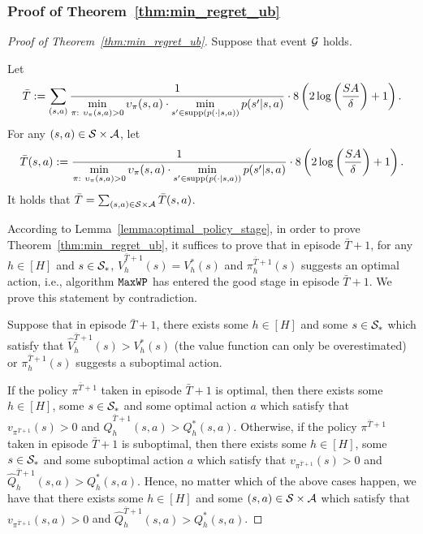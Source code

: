\subsubsection{Proof of Theorem~\ref{thm:min_regret_ub}}


\begin{proof}[Proof of Theorem~\ref{thm:min_regret_ub}]
	Suppose that event $\mathcal{G}$ holds.
	
	Let 
	$$
	\bar{T}:= \sum \limits_{(s,a)} \frac{1}{\min \limits_{\begin{subarray}{c} \pi:\  \upsilon_{\pi}(s,a)>0 \end{subarray}} \upsilon_{\pi}(s,a) \cdot \min \limits_{s' \in \textup{supp}( p(\cdot|s,a))} p(s'|s,a) } \cdot 8 \left( 2\log\left(  \frac{SA}{\delta}  \right)+1 \right) .
	$$ 
	For any $(s,a) \in \mathcal{S} \times \mathcal{A}$, let $$
	\bar{T}(s,a):= \frac{1}{\min \limits_{\begin{subarray}{c} \pi:\  \upsilon_{\pi}(s,a)>0 \end{subarray}} \upsilon_{\pi}(s,a) \cdot \min \limits_{s' \in \textup{supp}( p(\cdot|s,a))} p(s'|s,a) } \cdot 8 \left( 2\log\left(  \frac{SA}{\delta}  \right)+1 \right) .
	$$ 
	It holds that $\bar{T}=\sum_{(s,a) \in \mathcal{S} \times \mathcal{A}} \bar{T}(s,a)$.
	
	
	According to Lemma~\ref{lemma:optimal_policy_stage}, in order to prove Theorem~\ref{thm:min_regret_ub}, it suffices to prove that in episode $\bar{T}+1$, for any $h \in [H]$ and $s \in \mathcal{S}_*$, $\hat{V}^{\bar{T}+1}_h(s)=V^{*}_h(s)$ and $\pi^{\bar{T}+1}_h(s)$ suggests an optimal action, i.e., algorithm $\mathtt{MaxWP}$ has entered the good stage in episode $\bar{T}+1$. We prove this statement by contradiction.
	
	Suppose that in episode $\bar{T}+1$, there exists some $h \in [H]$ and some $s \in \mathcal{S}_*$ which satisfy that $\hat{V}^{\bar{T}+1}_h(s) > V^{*}_h(s)$ (the value function can only be overestimated) or $\pi^{\bar{T}+1}_h(s)$ suggests a suboptimal action. 
	
	If the policy $\pi^{\bar{T}+1}$ taken in episode $\bar{T}+1$ is optimal, then there exists some $h \in [H]$, some $s \in \mathcal{S}_*$ and some optimal action $a$ which satisfy that $v_{\pi^{\bar{T}+1}}(s)>0$ and $\hat{Q}^{\bar{T}+1}_h(s,a)>Q^{*}_h(s,a)$.
	Otherwise, if the policy $\pi^{\bar{T}+1}$ taken in episode $\bar{T}+1$ is suboptimal, then there exists some $h \in [H]$, some $s \in \mathcal{S}_*$ and some suboptimal action $a$ which satisfy that $v_{\pi^{\bar{T}+1}}(s)>0$ and $\hat{Q}^{\bar{T}+1}_h(s,a)>Q^{*}_h(s,a)$.  
	Hence, no matter which of the above cases happen, we have that there exists some $h \in [H]$ and some $(s,a) \in \mathcal{S} \times \mathcal{A}$ which satisfy that $v_{\pi^{\bar{T}+1}}(s,a)>0$ and $\hat{Q}^{\bar{T}+1}_h(s,a)>Q^{*}_h(s,a)$.
	

\end{proof}
